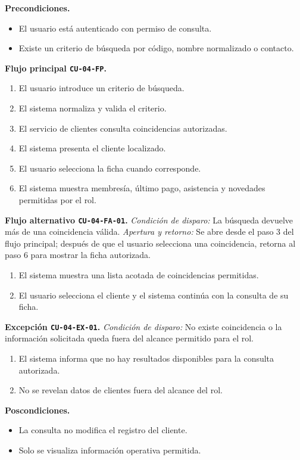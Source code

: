 \documentclass[11pt,a4paper,twoside]{article}
\begin{document}
\textbf{Precondiciones.}
\begin{itemize}
\item El usuario está autenticado con permiso de consulta.
\item Existe un criterio de búsqueda por código, nombre normalizado o contacto.
\end{itemize}

\textbf{Flujo principal \texttt{CU-04-FP}.}
\begin{enumerate}
\item El usuario introduce un criterio de búsqueda.
\item El sistema normaliza y valida el criterio.
\item El servicio de clientes consulta coincidencias autorizadas.
\item El sistema presenta el cliente localizado.
\item El usuario selecciona la ficha cuando corresponde.
\item El sistema muestra membresía, último pago, asistencia y novedades permitidas por el rol.
\end{enumerate}

\textbf{Flujo alternativo \texttt{CU-04-FA-01}.} \textit{Condición de disparo:} La búsqueda devuelve más de una coincidencia válida. \textit{Apertura y retorno:} Se abre desde el paso 3 del flujo principal; después de que el usuario selecciona una coincidencia, retorna al paso 6 para mostrar la ficha autorizada.
\begin{enumerate}[label=\alph*.]
\item El sistema muestra una lista acotada de coincidencias permitidas.
\item El usuario selecciona el cliente y el sistema continúa con la consulta de su ficha.
\end{enumerate}

\textbf{Excepción \texttt{CU-04-EX-01}.} \textit{Condición de disparo:} No existe coincidencia o la información solicitada queda fuera del alcance permitido para el rol.
\begin{enumerate}[label=\alph*.]
\item El sistema informa que no hay resultados disponibles para la consulta autorizada.
\item No se revelan datos de clientes fuera del alcance del rol.
\end{enumerate}

\textbf{Poscondiciones.}
\begin{itemize}
\item La consulta no modifica el registro del cliente.
\item Solo se visualiza información operativa permitida.
\end{itemize}
\end{document}
